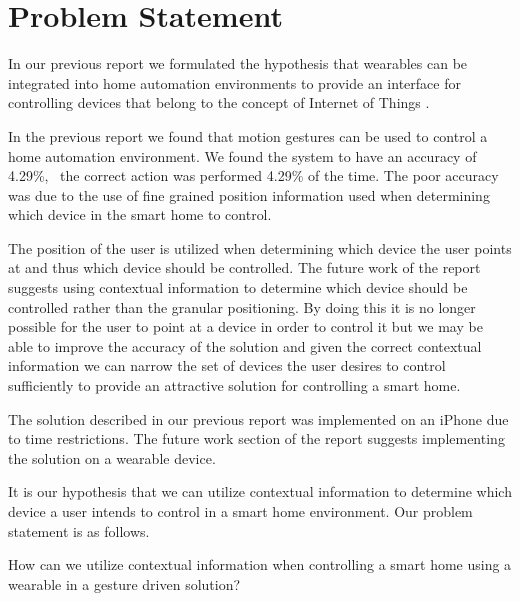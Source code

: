 \section{Problem Statement}
\label{sec:problem-statement}

In our previous report we formulated the hypothesis that wearables can be integrated into home automation environments to provide an interface for controlling devices that belong to the concept of Internet of Things \cite[pp. 14]{prespecialisation}.

In the previous report \cite[pp. 69-73]{prespecialisation} we found that motion gestures can be used to control a home automation environment. We found the system to have an accuracy of 4.29\%, \ie~the correct action was performed 4.29\% of the time. The poor accuracy was due to the use of fine grained position information used when determining which device in the smart home to control.

The position of the user is utilized when determining which device the user points at and thus which device should be controlled. The future work of the report \cite[pp. 71-73]{prespecialisation} suggests using contextual information to determine which device should be controlled rather than the granular positioning. By doing this it is no longer possible for the user to point at a device in order to control it but we may be able to improve the accuracy of the solution and given the correct contextual information we can narrow the set of devices the user desires to control sufficiently to provide an attractive solution for controlling a smart home.

The solution described in our previous report was implemented on an iPhone due to time restrictions. The future work section of the report suggests implementing the solution on a wearable device.

It is our hypothesis that we can utilize contextual information to determine which device a user intends to control in a smart home environment. Our problem statement is as follows.

\begin{framed}
  How can we utilize contextual information when controlling a smart home using a wearable in a gesture driven solution?
\end{framed}

